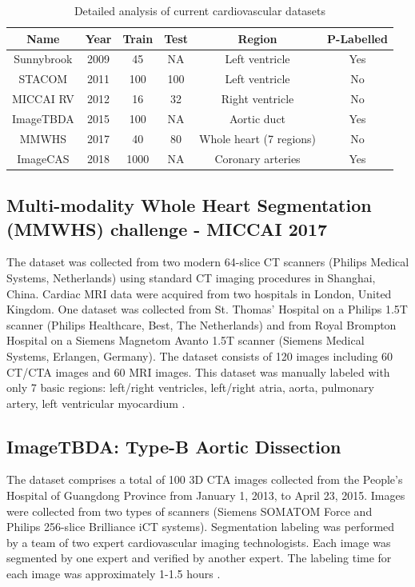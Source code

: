 \documentclass{article}
\begin{document}
\begin{table}[]
    \centering
    \begin{tabular}{c|c|c|c|c|c}
         \textbf{Name} & \textbf{Year} & \textbf{Train} & \textbf{Test} & \textbf{Region} & \textbf{P-Labelled} \\
         \midrule
         Sunnybrook & 2009 & 45 & NA & Left ventricle & Yes \\ 
         STACOM &  2011 & 100 & 100 & Left ventricle & No \\ 
         MICCAI RV & 2012 & 16 & 32 & Right ventricle & No \\ 
         ImageTBDA & 2015 & 100 & NA & Aortic duct & Yes \\ 
         MMWHS &  2017 & 40 & 80 & Whole heart (7 regions) & No \\ 
         ImageCAS & 2018 & 1000 & NA & Coronary arteries & Yes \\ 
    \end{tabular}
    \caption{Detailed analysis of current cardiovascular datasets}
    \label{tab:1}
\end{table}

\subsection{Multi-modality Whole Heart Segmentation (MMWHS) challenge - MICCAI 2017}
The dataset was collected from two modern 64-slice CT scanners (Philips Medical Systems, Netherlands) using standard CT imaging procedures in Shanghai, China. Cardiac MRI data were acquired from two hospitals in London, United Kingdom. One dataset was collected from St. Thomas' Hospital on a Philips 1.5T scanner (Philips Healthcare, Best, The Netherlands) and from Royal Brompton Hospital on a Siemens Magnetom Avanto 1.5T scanner (Siemens Medical Systems, Erlangen, Germany). The dataset consists of 120 images including 60 CT/CTA images and 60 MRI images. This dataset was manually labeled with only 7 basic regions: left/right ventricles, left/right atria, aorta, pulmonary artery, left ventricular myocardium \cite{MMWHS}.

\subsection{ImageTBDA: Type-B Aortic Dissection}
The dataset comprises a total of 100 3D CTA images collected from the People's Hospital of Guangdong Province from January 1, 2013, to April 23, 2015. Images were collected from two types of scanners (Siemens SOMATOM Force and Philips 256-slice Brilliance iCT systems). Segmentation labeling was performed by a team of two expert cardiovascular imaging technologists. Each image was segmented by one expert and verified by another expert. The labeling time for each image was approximately 1-1.5 hours \cite{imagetbad}.
\end{document}
